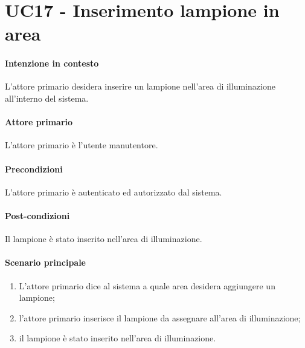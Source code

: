\section{UC17 - Inserimento lampione in area}\label{uc:17}
\paragraph{Intenzione in contesto} L'attore primario desidera inserire un lampione nell'area di illuminazione all'interno del sistema.
\paragraph{Attore primario} L'attore primario è l'utente manutentore.
\paragraph{Precondizioni}  L'attore primario è autenticato ed autorizzato dal sistema.
\paragraph{Post-condizioni} Il lampione è stato inserito nell'area di illuminazione.
\paragraph{Scenario principale}
\begin{enumerate}
    \item L'attore primario dice al sistema a quale area desidera aggiungere un lampione;
    \item l'attore primario inserisce il lampione da assegnare all'area di illuminazione;
    \item il lampione è stato inserito nell'area di illuminazione.
\end{enumerate}